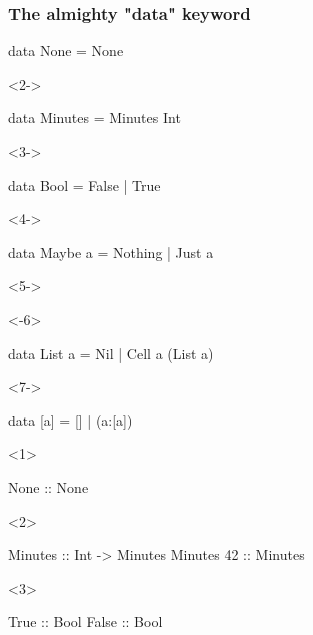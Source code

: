 \documentclass[17pt]{beamer}
\renewcommand{\(}[1]{\begin{columns}[#1]}
\renewcommand{\)}{\end{columns}}
\newcommand{\<}[1]{\begin{column}{#1}}
\renewcommand{\>}{\end{column}}
\begin{document}
\begin{frame}[fragile]
\frametitle{The almighty "data" keyword}
\begin{code}
    data None    = None
\end{code}
\begin{uncoverenv}<2->
\begin{code}
    data Minutes = Minutes Int
\end{code}
\end{uncoverenv}
\begin{uncoverenv}<3->
\begin{code}
    data Bool    =   False | True
\end{code}
\end{uncoverenv}
\begin{uncoverenv}<4->
\begin{code}
    data Maybe a = Nothing | Just a
\end{code}
\end{uncoverenv}
\begin{uncoverenv}<5->
\begin{onlyenv}<-6>
\begin{code}
    data List  a =     Nil | Cell a (List a)
\end{code}
\end{onlyenv}
\begin{onlyenv}<7->
\begin{code}
    data [a]     =      [] | (a:[a])
\end{code}
\end{onlyenv}
\end{uncoverenv}
\begin{minipage}[t][.3\textheight]{\textwidth}
\begin{center}
\begin{onlyenv}<1>
\begin{code}
                      None :: None
\end{code}
\end{onlyenv}
\begin{onlyenv}<2>
\begin{code}
                Minutes    :: Int -> Minutes
                Minutes 42 ::        Minutes
\end{code}
\end{onlyenv}
\begin{onlyenv}<3>
\begin{code}
                     True  :: Bool
                     False :: Bool
\end{code}

\end{onlyenv}
\end{center}
\end{minipage}
\end{frame}
\end{document}
